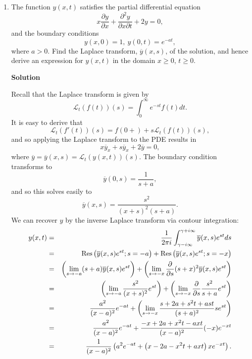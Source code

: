 \documentclass{article}
\def\Res{\mathop{\rm Res}\nolimits}
\begin{document}
\begin{enumerate}
\begin{itemize}
\end{itemize}



\item The function \(y(x,t)\) satisfies the partial differential equation
\[x \frac{\partial y}{\partial x} + \frac{\partial^2 y}{\partial x \partial t} + 2 y = 0,\]
and the boundary conditions
\[y(x,0) = 1, \ y(0,t) = e^{-a t},\]
where \(a > 0\).  Find the Laplace transform, \(\overline{y}(x,s)\), of the solution, and hence derive an expression for \(y(x,t)\) in the domain \(x \geq 0\), \(t \geq 0\).

{\bf Solution}

Recall that the Laplace transform is given by
\[\mathcal{L}_t(f(t))(s) = \int_0^{\infty} e^{-s t} f(t) dt.\]
It is easy to derive that
\[\mathcal{L}_t(f'(t))(s) = f(0+) + s \mathcal{L}_t(f(t))(s),\]
and so applying the Laplace transform to the PDE results in
\[x \overline{y}_x + s \overline{y}_x + 2 \overline{y} = 0,\]
where \(\overline{y} = \overline{y}(x,s) = \mathcal{L}_t(y(x,t))(s)\).  The boundary condition transforms to
\[\overline{y}(0,s) = \frac{1}{s + a},\]
and so this solves easily to
\[\overline{y}(x,s) = \frac{s^2}{(x + s)^2 (s + a)}.\]
We can recover \(y\) by the inverse Laplace transform via contour integration:
\begin{eqnarray*}
y(x,t) & = & \frac{1}{2 \pi i} \int_{\gamma - i \infty}^{\gamma + i \infty} \overline{y}(x,s) e^{s t} ds \\
       & = & \Res \left( \overline{y}(x,s) e^{s t}; s = -a \right) + \Res \left( \overline{y}(x,s) e^{s t}; s = -x \right) \\
       & = & \left( \lim_{s \to -a} (s + a) \overline{y}(x,s) e^{s t} \right) + \left( \lim_{s \to -x} \frac{\partial}{\partial s} (s + x)^2 \overline{y}(x,s) e^{s t} \right) \\
       & = & \left( \lim_{s \to -a} \frac{s^2}{(x + s)^2} e^{s t} \right) + \left( \lim_{s \to -x} \frac{\partial}{\partial s} \frac{s^2}{s + a} e^{s t} \right) \\
       & = & \frac{a^2}{(x - a)^2} e^{-a t} + \left( \lim_{s \to -x} \frac{s + 2 a + s^2 t + a s t}{(s + a)^2} s e^{s t} \right) \\
       & = & \frac{a^2}{(x - a)^2} e^{-a t} + \frac{-x + 2 a + x^2 t - a x t}{(x - a)^2} (-x) e^{-x t} \\
       & = & \frac{1}{(x - a)^2} \left( a^2 e^{-a t} + \left( x - 2 a - x^2 t + a x t \right) x e^{-x t} \right).
\end{eqnarray*}



\end{enumerate}
\end{document}
